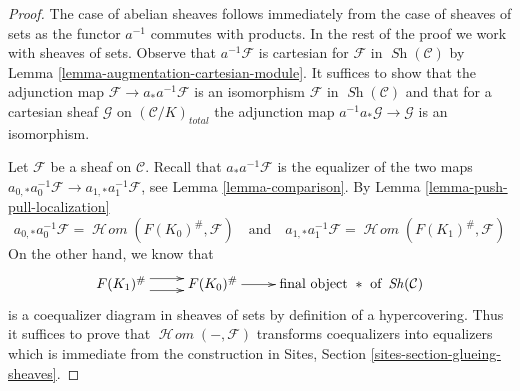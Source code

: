 \documentclass{stacks-project}
\theoremstyle{plain}
\theoremstyle{definition}
\theoremstyle{remark}
\numberwithin{equation}{subsection}
\def\SheafHom{\mathop{\mathcal{H}\!\mathit{om}}\nolimits}
\def\Sh{\mathop{\mathit{Sh}}\nolimits}
\begin{document}
\begin{proof}
The case of abelian sheaves follows immediately from the case
of sheaves of sets as the functor $a^{-1}$ commutes with products.
In the rest of the proof we work with sheaves of sets.
Observe that $a^{-1}\mathcal{F}$ is cartesian for
$\mathcal{F}$ in $\Sh(\mathcal{C})$ by
Lemma \ref{lemma-augmentation-cartesian-module}.
It suffices to show that the adjunction map
$\mathcal{F} \to a_*a^{-1}\mathcal{F}$
is an isomorphism $\mathcal{F}$ in $\Sh(\mathcal{C})$
and that for a cartesian sheaf
$\mathcal{G}$ on $(\mathcal{C}/K)_{total}$
the adjunction map
$a^{-1}a_*\mathcal{G} \to \mathcal{G}$ is an isomorphism.

\medskip\noindent
Let $\mathcal{F}$ be a sheaf on $\mathcal{C}$.
Recall that $a_*a^{-1}\mathcal{F}$ is the equalizer
of the two maps $a_{0, *}a_0^{-1}\mathcal{F} \to a_{1, *}a_1^{-1}\mathcal{F}$,
see Lemma \ref{lemma-comparison}.
By Lemma \ref{lemma-push-pull-localization}
$$
a_{0, *}a_0^{-1}\mathcal{F} = \SheafHom(F(K_0)^\#, \mathcal{F})
\quad\text{and}\quad
a_{1, *}a_1^{-1}\mathcal{F} = \SheafHom(F(K_1)^\#, \mathcal{F})
$$
On the other hand, we know that
$$
\xymatrix{
F(K_1)^\# \ar@<1ex>[r] \ar@<-1ex>[r] &
F(K_0)^\# \ar[r] & \text{final object }*\text{ of }\Sh(\mathcal{C})
}
$$
is a coequalizer diagram in sheaves of sets by definition of
a hypercovering. Thus it suffices to prove
that $\SheafHom(-, \mathcal{F})$ transforms coequalizers
into equalizers which is immediate from the construction
in Sites, Section \ref{sites-section-glueing-sheaves}.


\end{proof}
\end{document}
